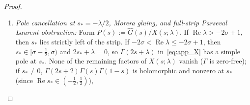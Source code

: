 \documentclass[11pt,a4paper]{article}
\begin{document}
\begin{proof}
\begin{enumerate}
  (so $\lim_{z\to-\infty}e^{-sz}G(z)=0$ on the left boundary line $\operatorname{Re}s=\sigma-\tfrac12$).
  For $z\ge 0$ and $\sigma'\in[\sigma-\tfrac12,\sigma]$, $-2\sigma' z\le -2(\sigma-\tfrac12)z$ (Lean: \texttt{left\_strip\_far\_exponent\_le}),
  so $(2\partial_z+\lambda)G_+\in L^2_{\sigma'}([0,\infty))$ across the entire left strip, and
  $\mathcal{H}_+(s):=\int_0^\infty e^{-sz}(2\partial_z+\lambda)G(z)\,dz$ is holomorphic on $\operatorname{Re}s>\sigma-\tfrac12$
  with uniform $L^2(\mathbb{R}_\tau)$ norms on $[\sigma-\tfrac12,\sigma]$.
  On the right boundary line $\operatorname{Re}s=\sigma$ (where $e^{-\sigma z}G_+\in H^1([0,\infty))$), integrating by parts on $[0,\infty)$ gives
  $\mathcal{G}_+(\sigma+i\tau)=(2G(0)+\mathcal{H}_+(\sigma+i\tau))/(2(\sigma+i\tau)+\lambda)$ in $L^2(\mathbb{R}_\tau)$.
  Consequently, the mixed-Laplace representation (\texttt{edge\_w2\_w3\_closure.py}, \texttt{W2-A})
  \[
  \widehat{G}(s) := \mathcal{G}_-(s) + \frac{2G(0)+\mathcal{H}_+(s)}{2s+\lambda}
  \qquad (\sigma-\tfrac12\le\operatorname{Re}s\le\sigma)
  \]
  defines the meromorphic continuation of $\widehat{G}$ from $\operatorname{Re}s=\sigma$ across the strip
  $\sigma-\tfrac12\le\operatorname{Re}s\le\sigma$ with at most a simple pole at $s_*=-\lambda/2$ ($\operatorname{Re}s_*<\sigma$),
  without assuming $G_+\in L^2_{\sigma-1/2}([0,\infty))$.
  Moreover, on $(-\infty,0]$, since $e^{-(\sigma-1/2)z}G_-\in H^1((-\infty,0])$ has $\lim_{z\to-\infty}e^{-sz}G(z)=0$ on
  $\operatorname{Re}s=\sigma-\tfrac12$, integration by parts holds on the left boundary line $\operatorname{Re}s=\sigma-\tfrac12$ as well,
  giving $(2s+\lambda)\mathcal{G}_-(s)=-2G(0)+\int_{-\infty}^0 e^{-sz}(2\partial_z+\lambda)G(z)\,dz$; adding
  $2G(0)+\mathcal{H}_+(s)$ cancels $\pm 2G(0)$ identically on $\operatorname{Re}s=\sigma-\tfrac12$, so
  $(2s+\lambda)\widehat{G}(s)=\int_{\mathbb{R}}e^{-sz}e^{-z/2}(T_c G)(z)\,dz = c(s+\tfrac12)\widehat{G}(s+\tfrac12)$
  holds in $L^2(\mathbb{R}_\tau)$ for $s=\sigma-\tfrac12+i\tau$ ($s+\tfrac12=\sigma+i\tau$).
\item \emph{Pole cancellation at $s_*=-\lambda/2$, Morera gluing, and full-strip Parseval Laurent obstruction:}
  Form $P(s):=\widehat{G}(s)/X(s;\lambda)$. If $\operatorname{Re}\lambda>-2\sigma+1$, then $s_*$ lies strictly left of the strip.
  If $-2\sigma<\operatorname{Re}\lambda\le -2\sigma+1$, then $s_*\in[\sigma-\tfrac12,\sigma)$ and $2s_*+\lambda=0$, so $\Gamma(2s+\lambda)$
  in~\eqref{eq:app_X} has a simple pole at $s_*$. None of the remaining factors of $X(s;\lambda)$ vanish ($\Gamma$ is zero-free);
  if $s_*\ne 0$, $\Gamma(2s+2)\Gamma(s)\Gamma(1-s)$ is holomorphic and nonzero at $s_*$ (since $\operatorname{Re}s_*\in(-\tfrac12,\tfrac12)$),

\end{enumerate}
\end{proof}
\end{document}
